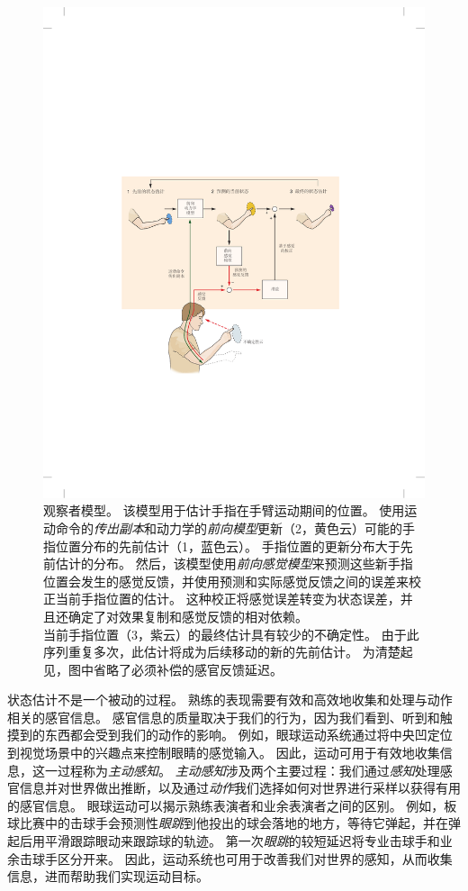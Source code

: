 \begin{figure}[htbp]
	\centering
	\includegraphics[width=0.9\linewidth]{chap30/fig_30_5}
	\caption{观察者模型。
		该模型用于估计手指在手臂运动期间的位置。
		使用运动命令的\textit{传出副本}和动力学的\textit{前向模型}更新（2，黄色云）可能的手指位置分布的先前估计（1，蓝色云）。
		手指位置的更新分布大于先前估计的分布。
		然后，该模型使用\textit{前向感觉模型}来预测这些新手指位置会发生的感觉反馈，并使用预测和实际感觉反馈之间的误差来校正当前手指位置的估计。
		这种校正将感觉误差转变为状态误差，并且还确定了对效果复制和感觉反馈的相对依赖。\\
		当前手指位置（3，紫云）的最终估计具有较少的不确定性。
		由于此序列重复多次，此估计将成为后续移动的新的先前估计。
		为清楚起见，图中省略了必须补偿的感官反馈延迟。}
	\label{fig:30_5}
\end{figure}


状态估计不是一个被动的过程。
熟练的表现需要有效和高效地收集和处理与动作相关的感官信息。
感官信息的质量取决于我们的行为，因为我们看到、听到和触摸到的东西都会受到我们的动作的影响。
例如，眼球运动系统通过将中央凹定位到视觉场景中的兴趣点来控制眼睛的感觉输入。
因此，运动可用于有效地收集信息，这一过程称为\textit{主动感知}。
\textit{主动感知}涉及两个主要过程：我们通过\textit{感知}处理感官信息并对世界做出推断，以及通过\textit{动作}我们选择如何对世界进行采样以获得有用的感官信息。
眼球运动可以揭示熟练表演者和业余表演者之间的区别。
例如，板球比赛中的击球手会预测性\textit{眼跳}到他投出的球会落地的地方，等待它弹起，并在弹起后用平滑跟踪眼动来跟踪球的轨迹。
第一次\textit{眼跳}的较短延迟将专业击球手和业余击球手区分开来。
因此，运动系统也可用于改善我们对世界的感知，从而收集信息，进而帮助我们实现运动目标。



